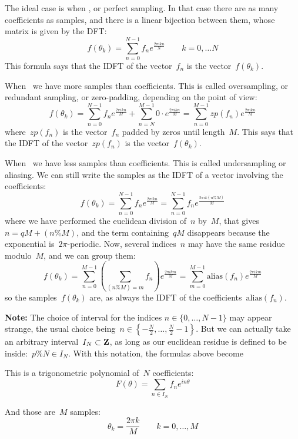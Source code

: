 \bigskip

The ideal case is when , or perfect sampling.  In that case there
are as many coefficients as samples, and there is a linear bijection between
them, whose matrix is given by the DFT:
\[
	f(\theta_k)=\sum_{n=0}^{N-1} f_n e^{\frac{2\pi i k n}{N}}
	\qquad
	k=0,\ldots N
\]
This formula says that the IDFT of the vector~$f_n$ is the
vector~$f(\theta_k)$.

\bigskip

When~ we have more samples than coefficients.  This is called
oversampling, or redundant sampling, or zero-padding, depending on the point of
view:
\[
	f(\theta_k)=\sum_{n=0}^{N-1} f_n e^{\frac{2\pi i k n}{M}}
	+\sum_{n=N}^{M-1} 0\cdot e^{\frac{2\pi i k n}{M}}
	=\sum_{n=0}^{M-1} zp(f_n) e^{\frac{2\pi i k n}{M}}
\]
where~$zp(f_n)$ is the vector~$f_n$ padded by zeros until length~$M$.
This says that the IDFT of the vector~$zp(f_n)$ is the vector~$f(\theta_k)$.


\bigskip

When~ we have less samples than coefficients.  This is called
undersampling or aliasing.  We can still write the samples as the IDFT of a
vector involving the coefficients:
\[
	f(\theta_k)
	=
	\sum_{n=0}^{N-1} f_n e^{\frac{2\pi i k n}{M}}
	=
	\sum_{n=0}^{N-1} f_n e^{\frac{2\pi i k (n\% M)}{M}}
\]
where we have performed the euclidean division of~$n$ by~$M$, that
gives~$n=qM+(n\% M)$, and the term containing~$qM$ disappears because the
exponential is~$2\pi$-periodic.  Now, several indices~$n$ may have the same
residue modulo~$M$, and we can group them:
\[
	f(\theta_k)
	=
	\sum_{n=0}^{M-1}\left(\sum_{(n\%M)=m}f_n\right) e^{\frac{2\pi i k m}{M}}
	=
	\sum_{m=0}^{M-1} \mathrm{alias}(f_n) e^{\frac{2\pi i k m}{M}}
\]
so the samples~$f(\theta_k)$ are, as always the IDFT of the
coefficients~$\mathrm{alias}(f_n)$.

\bigskip

{\bf Note:}
The choice of interval for the indices $n\in\{0,\ldots,N-1\}$ may appear
strange, the usual choice
being~$n\in\left\{-\frac{N}{2},\ldots,\frac{N}{2}-1\right\}$.
But we can actually take an arbitrary interval~$I_N\subset\mathbf{Z}$, as long as our
euclidean residue is defined to be inside:~$p\% N\in I_N$.  With this notation,
the formulas above become

\clearpage

This is a trigonometric polynomial of~$N$ coefficients:
\[
	F(\theta)=\sum_{n\in I_N}f_n e^{in\theta}
\]


And those are~$M$ samples:
\[
	\theta_k=\frac{2\pi k}{M} \qquad k=0,\ldots,M
\]

